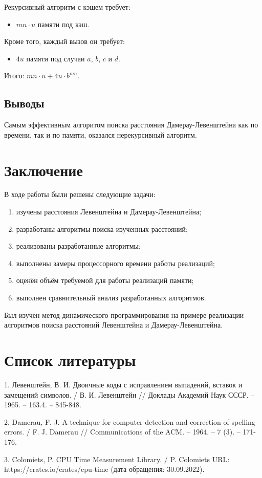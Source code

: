 \documentclass{report}
\begin{document}
Рекурсивный алгоритм с кэшем требует:

\begin{itemize}
    \item $mn \cdot u$ памяти под кэш.
\end{itemize}

Кроме того, каждый вызов он требует:

\begin{itemize}
    \item $4u$ памяти под случаи $a$, $b$, $c$ и $d$.
\end{itemize}

Итого: $mn \cdot u + 4u \cdot b^{mn}$.

\section{Выводы}

Самым эффективным алгоритом поиска расстояния Дамерау-Левенштейна
как по времени, так и по памяти, оказался нерекурсивный алгоритм.

\chapter*{Заключение}

В ходе работы были решены следующие задачи:

\begin{enumerate}
    \item изучены расстояния Левенштейна и Дамерау-Левенштейна;
    \item разработаны алгоритмы поиска изученных расстояний;
    \item реализованы разработанные алгоритмы;
    \item выполнены замеры процессорного времени работы реализаций;
    \item оценён объём требуемой для работы реализаций памяти;
    \item выполнен сравнительный анализ разработанных алгоритмов.
\end{enumerate}

Был изучен метод динамического программирования на примере
реализации алгоритмов поиска расстояний Левенштейна и
Дамерау-Левенштейна.

\chapter*{Список литературы}

1. Левенштейн, В. И. Двоичные коды с исправлением выпадений,
вставок и замещений символов. / В. И. Левенштейн // Доклады
Академий Наук СССР. -- 1965. -- 163.4. -- 845-848.

2. Damerau, F. J. A technique for computer detection and correction
of spelling errors. / F. J. Damerau // Communications of the ACM.
-- 1964. -- 7 (3). -- 171-176.

3. Colomiets, P. CPU Time Measurement Library. / P. Colomiets
URL: https://crates.io/crates/cpu-time
(дата обращения: 30.09.2022).
\end{document}
